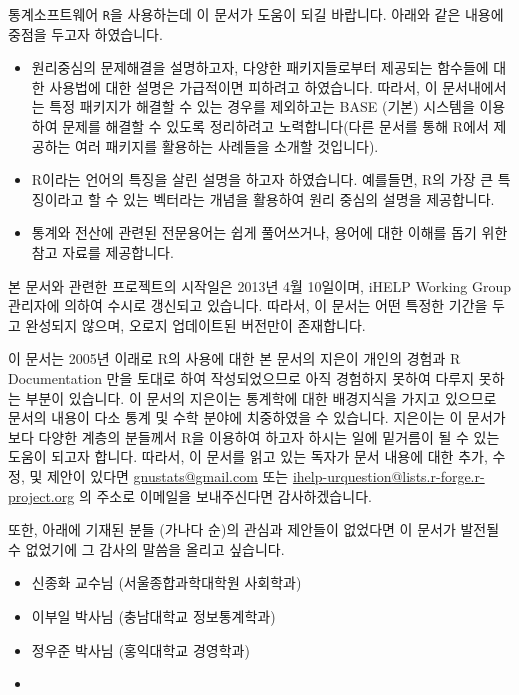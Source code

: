 통계소프트웨어 \texttt{R}을 사용하는데 이 문서가 도움이 되길 바랍니다. 
아래와 같은 내용에 중점을 두고자 하였습니다. 

\begin{itemize}
\item 원리중심의 문제해결을 설명하고자, 다양한 패키지들로부터 제공되는 함수들에 대한 사용법에 대한 설명은 가급적이면 피하려고 하였습니다.
따라서, 이 문서내에서는 특정 패키지가 해결할 수 있는 경우를 제외하고는 BASE (기본) 시스템을 이용하여 문제를 해결할 수 있도록 정리하려고 노력합니다(다른 문서를 통해 R에서 제공하는 여러 패키지를 활용하는 사례들을 소개할 것입니다).

\item R이라는 언어의 특징을 살린 설명을 하고자 하였습니다.  
예를들면, R의 가장 큰 특징이라고 할 수 있는 벡터라는 개념을 활용하여 원리 중심의 설명을 제공합니다. 

\item 통계와 전산에 관련된 전문용어는 쉽게 풀어쓰거나, 용어에 대한 이해를 돕기 위한 참고 자료를 제공합니다. 
\end{itemize}

본 문서와 관련한 프로젝트의 시작일은 2013년 4월 10일이며, iHELP Working Group 관리자에 의하여 수시로 갱신되고 있습니다.
따라서, 이 문서는 어떤 특정한 기간을 두고 완성되지 않으며, 오로지 업데이트된 버전만이 존재합니다.

이 문서는 2005년 이래로 R의 사용에 대한 본 문서의 지은이 개인의 경험과 R Documentation 만을 토대로 하여 작성되었으므로 아직 경험하지 못하여 다루지 못하는 부분이 있습니다.
이 문서의 지은이는 통계학에 대한 
배경지식을 가지고 있으므로 문서의 내용이 다소 통계 및 수학 분야에 치중하였을 수 있습니다.
지은이는 이 문서가 보다 다양한 계층의 분들께서 R을 이용하여 하고자 하시는 일에 밑거름이 될 수 있는 도움이 되고자 합니다.
따라서, 이 문서를 읽고 있는 독자가 문서 내용에 대한 추가, 수정, 및 제안이 있다면 \href{mailto:gnustats@gmail.com}{gnustats@gmail.com} 또는 \href{mailto:ihelp-urquestion@lists.r-forge.r-project.org}{ihelp-urquestion@lists.r-forge.r-project.org} 의 주소로 이메일을 보내주신다면 감사하겠습니다. 

또한, 아래에 기재된 분들 (가나다 순)의 관심과 제안들이 없었다면 이 문서가 발전될 수 없었기에 그 감사의 말씀을 올리고 싶습니다. 
\begin{itemize}
\item 신종화 교수님 (서울종합과학대학원 사회학과)
\item 이부일 박사님 (충남대학교 정보통계학과)
\item 정우준 박사님 (홍익대학교 경영학과)
\item 
\end{itemize}

